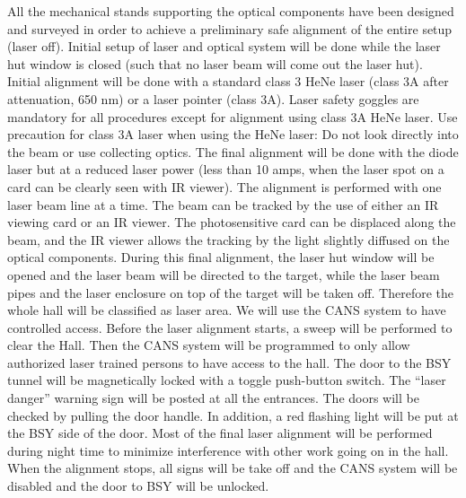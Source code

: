 {All the mechanical stands supporting the optical components have been
designed and surveyed in order to achieve a preliminary safe alignment
of the entire setup (laser off).  Initial setup of laser and optical
system will be done while the laser hut window is closed (such that no
laser beam will come out the laser hut).  Initial alignment will be
done with a standard class 3 HeNe laser (class 3A after attenuation,
650 nm) or a laser pointer (class 3A).  Laser safety goggles are
mandatory for all procedures except for alignment using class 3A HeNe
laser. Use precaution for class 3A laser when using the HeNe laser: Do
not look directly into the beam or use collecting optics.  The final
alignment will be done with the diode laser but at a reduced laser
power (less than 10 amps, when the laser spot on a card can be clearly
seen with IR viewer). The alignment is performed with one laser beam
line at a time.  The beam can be tracked by the use of either an IR
viewing card or an IR viewer.  The photosensitive card can be
displaced along the beam, and the IR viewer allows the tracking by the
light slightly diffused on the optical components. During this final
alignment, the laser hut window will be opened and the laser beam will
be directed to the target, while the laser beam pipes and the laser
enclosure on top of the target will be taken off. Therefore the whole
hall will be classified as laser area. We will use the CANS system to
have controlled access. Before the laser alignment starts, a sweep
will be performed to clear the Hall. Then the CANS system will be
programmed to only allow authorized laser trained persons to have
access to the hall.  The door to the BSY tunnel will be magnetically
locked with a toggle push-button switch. The ``laser danger'' warning
sign will be posted at all the entrances. The doors will be checked by
pulling the door handle. In addition, a red flashing light will be put
at the BSY side of the door.
Most of the final laser alignment will be performed during night time
to minimize interference with other work going on in the hall. When
the alignment stops, all signs will be take off and the CANS system
will be disabled and the door to BSY will be unlocked.

}
